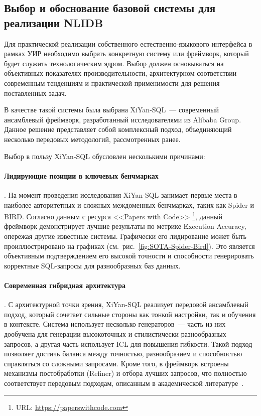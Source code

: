 \subsection{Выбор и обоснование базовой системы для реализации NLIDB}
Для практической реализации собственного естественно-языкового интерфейса в рамках
УИР необходимо выбрать конкретную систему или фреймворк,
который будет служить технологическим ядром. Выбор должен основываться на
объективных показателях производительности, архитектурном соответствии современным
тенденциям и практической применимости для решения поставленных задач.

В качестве такой системы была выбрана XiYan-SQL~--- современный ансамблевый фреймворк,
разработанный исследователями из Alibaba Group\cite{gaoPreviewXiYanSQLMultiGenerator2025}.
Данное решение представляет собой комплексный подход,
объединяющий несколько передовых методологий, рассмотренных ранее.

Выбор в пользу XiYan-SQL обусловлен несколькими причинами:

\paragraph{Лидирующие позиции в ключевых бенчмарках}. На момент проведения исследования XiYan-SQL
занимает первые места в наиболее авторитетных и сложных междоменных бенчмарках,
таких как Spider и BIRD.
Согласно данным с ресурса <<Papers with Code>> 
\footnote{URL: \url{https://paperswithcode.com}}, данный фреймворк демонстрирует
лучшие результаты по метрике Execution Accuracy,
опережая другие известные системы. Графически его лидирование может быть проиллюстрировано 
на графиках (см.~рис.~\ref{fig:SOTA-Spider-Bird}).
Это является объективным подтверждением
его высокой точности и способности генерировать корректные SQL-запросы
для разнообразных баз данных.

\paragraph{Современная гибридная архитектура}. С архитектурной точки зрения,
XiYan-SQL реализует передовой ансамблевый подход,
который сочетает сильные стороны как тонкой настройки,
так и обучения в контексте.
Система использует несколько генераторов~--- часть из них дообучена
для генерации высокоточных и стилистически разнообразных запросов,
а другая часть использует ICL для повышения гибкости.
Такой подход позволяет достичь баланса между точностью,
разнообразием и способностью справляться со сложными запросами.
Кроме того, в фреймворк встроены механизмы постобработки (Refiner) и
отбора лучших запросов, что полностью соответствует передовым подходам,
описанным в академической литературе~\cite{gaoPreviewXiYanSQLMultiGenerator2025,
	huangExploringLandscapeTexttoSQL2025}.

